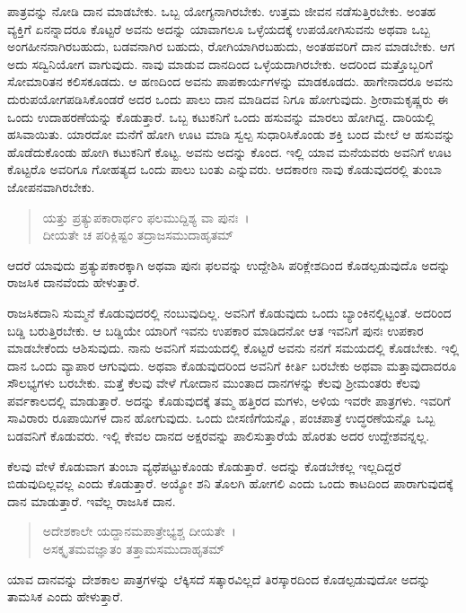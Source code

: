 ಪಾತ್ರವನ್ನು ನೋಡಿ ದಾನ ಮಾಡಬೇಕು. ಒಬ್ಬ ಯೋಗ್ಯನಾಗಿರಬೇಕು. ಉತ್ತಮ ಜೀವನ ನಡೆಸುತ್ತಿರಬೇಕು. ಅಂತಹ ವ್ಯಕ್ತಿಗೆ ಏನನ್ನಾದರೂ ಕೊಟ್ಟರೆ ಅವನು ಅದನ್ನು ಯಾವಾಗಲೂ ಒಳ್ಳೆಯದಕ್ಕೆ ಉಪಯೋಗಿಸುವನು ಅಥವಾ ಒಬ್ಬ ಅಂಗಹೀನನಾಗಿರಬಹುದು, ಬಡವನಾಗಿರ ಬಹುದು, ರೋಗಿಯಾಗಿರಬಹುದು, ಅಂತಹವರಿಗೆ ದಾನ ಮಾಡಬೇಕು. ಆಗ ಅದು ಸದ್ವಿನಿಯೋಗ ವಾಗುವುದು. ನಾವು ಮಾಡುವ ದಾನದಿಂದ ಒಳ್ಳೆಯದಾಗಿರಬೇಕು. ಅದರಿಂದ ಮತ್ತೊಬ್ಬರಿಗೆ ಸೋಮಾರಿತನ ಕಲಿಸಕೂಡದು. ಆ ಹಣದಿಂದ ಅವನು ಪಾಪಕಾರ್ಯಗಳನ್ನು ಮಾಡಕೂಡದು. ಹಾಗೇನಾದರೂ ಅವನು ದುರುಪಯೋಗಪಡಿಸಿಕೊಂಡರೆ ಅದರ ಒಂದು ಪಾಲು ದಾನ ಮಾಡಿದವ ನಿಗೂ ಹೋಗುವುದು. ಶ‍್ರೀರಾಮಕೃಷ್ಣರು ಈ ಒಂದು ಉದಾಹರಣೆಯನ್ನು ಕೊಡುತ್ತಾರೆ. ಒಬ್ಬ ಕಟುಕನಿಗೆ ಒಂದು ಹಸುವನ್ನು ಮಾರಲು ಹೋಗಿದ್ದ. ದಾರಿಯಲ್ಲಿ ಹಸಿವಾಯಿತು. ಯಾರದೋ ಮನೆಗೆ ಹೋಗಿ ಊಟ ಮಾಡಿ ಸ್ವಲ್ಪ ಸುಧಾರಿಸಿಕೊಂಡು ಶಕ್ತಿ ಬಂದ ಮೇಲೆ ಆ ಹಸುವನ್ನು ಹೊಡೆದುಕೊಂಡು ಹೋಗಿ ಕಟುಕನಿಗೆ ಕೊಟ್ಟ. ಅವನು ಅದನ್ನು ಕೊಂದ. ಇಲ್ಲಿ ಯಾವ ಮನೆಯವರು ಅವನಿಗೆ ಊಟ ಕೊಟ್ಟರೊ ಅವರಿಗೂ ಗೋಹತ್ಯದ ಒಂದು ಪಾಲು ಬಂತು ಎನ್ನುವರು. ಆದಕಾರಣ ನಾವು ಕೊಡುವುದರಲ್ಲಿ ತುಂಬಾ ಜೋಪನವಾಗಿರಬೇಕು.

\begin{verse}
ಯತ್ತು ಪ್ರತ್ಯುಪಕಾರಾರ್ಥಂ ಫಲಮುದ್ದಿಶ್ಯ ವಾ ಪುನಃ~।\\ದೀಯತೇ ಚ ಪರಿಕ್ಲಿಷ್ಟಂ ತದ್ರಾಜಸಮುದಾಹೃತಮ್ 
\end{verse}

{\small ಆದರೆ ಯಾವುದು ಪ್ರತ್ಯುಪಕಾರಕ್ಕಾಗಿ ಅಥವಾ ಪುನಃ ಫಲವನ್ನು ಉದ್ದೇಶಿಸಿ ಪರಿಕ್ಲೇಶದಿಂದ ಕೊಡಲ್ಪಡುವುದೊ ಅದನ್ನು ರಾಜಸಿಕ ದಾನವೆಂದು ಹೇಳುತ್ತಾರೆ.}

ರಾಜಸಿಕದಾನಿ ಸುಮ್ಮನೆ ಕೊಡುವುದರಲ್ಲಿ ನಂಬುವುದಿಲ್ಲ. ಅವನಿಗೆ ಕೊಡುವುದು ಒಂದು ಬ್ಯಾಂಕಿನಲ್ಲಿಟ್ಟಂತೆ. ಅದರಿಂದ ಬಡ್ಡಿ ಬರುತ್ತಿರಬೇಕು. ಆ ಬಡ್ಡಿಯೇ ಯಾರಿಗೆ ಇವನು ಉಪಕಾರ ಮಾಡಿದನೋ ಆತ ಇವನಿಗೆ ಪುನಃ ಉಪಕಾರ ಮಾಡಬೇಕೆಂದು ಆಶಿಸುವುದು. ನಾನು ಅವನಿಗೆ ಸಮಯದಲ್ಲಿ ಕೊಟ್ಟರೆ ಅವನು ನನಗೆ ಸಮಯದಲ್ಲಿ ಕೊಡಬೇಕು. ಇಲ್ಲಿ ದಾನ ಒಂದು ವ್ಯಾಪಾರ ಆಗುವುದು. ಅಥವಾ ಕೊಡುವುದರಿಂದ ಅವನಿಗೆ ಕೀರ್ತಿ ಬರಬೇಕು ಅಥವಾ ಮತ್ತಾವುದಾದರೂ ಸೌಲಭ್ಯಗಳು ಬರಬೇಕು. ಮತ್ತೆ ಕೆಲವು ವೇಳೆ ಗೋದಾನ ಮುಂತಾದ ದಾನಗಳನ್ನು ಕೆಲವು ಶ‍್ರೀಮಂತರು ಕೆಲವು ಪರ್ವಕಾಲದಲ್ಲಿ ಮಾಡುತ್ತಾರೆ. ಅದನ್ನು ಕೊಡುವುದಕ್ಕೆ ತಮ್ಮ ಹತ್ತಿರದ ಮಗಳು, ಅಳಿಯ ಇವರೇ ಪಾತ್ರಗಳು. ಇವರಿಗೆ ಸಾವಿರಾರು ರೂಪಾಯಿಗಳ ದಾನ ಹೋಗುವುದು. ಒಂದು ಬೀಸಣಿಗೆಯನ್ನೊ, ಪಂಚಪಾತ್ರೆ ಉದ್ಧರಣೆಯನ್ನೊ ಒಬ್ಬ ಬಡವನಿಗೆ ಕೊಡುವರು. ಇಲ್ಲಿ ಕೇವಲ ದಾನದ ಅಕ್ಷರವನ್ನು ಪಾಲಿಸುತ್ತಾರೆಯೆ ಹೊರತು ಅದರ ಉದ್ದೇಶವನ್ನಲ್ಲ.

ಕೆಲವು ವೇಳೆ ಕೊಡುವಾಗ ತುಂಬಾ ವ್ಯಥೆಪಟ್ಟುಕೊಂಡು ಕೊಡುತ್ತಾರೆ. ಅದನ್ನು ಕೊಡಬೇಕಲ್ಲ ಇಲ್ಲದಿದ್ದರೆ ಬಿಡುವುದಿಲ್ಲವಲ್ಲ ಎಂದು ಕೊಡುತ್ತಾರೆ. ಅಯ್ಯೋ ಶನಿ ತೊಲಗಿ ಹೋಗಲಿ ಎಂದು ಒಂದು ಕಾಟದಿಂದ ಪಾರಾಗುವುದಕ್ಕೆ ದಾನ ಮಾಡುತ್ತಾರೆ. ಇವೆಲ್ಲ ರಾಜಸಿಕ ದಾನ.

\begin{verse}
ಅದೇಶಕಾಲೇ ಯದ್ದಾನಮಪಾತ್ರೇಭ್ಯಶ್ಚ ದೀಯತೇ~।\\ಅಸಕ್ಕೃತಮವಜ್ಞಾತಂ ತತ್ತಾಮಸಮುದಾಹೃತಮ್ 
\end{verse}

{\small ಯಾವ ದಾನವನ್ನು ದೇಶಕಾಲ ಪಾತ್ರಗಳನ್ನು ಲೆಕ್ಕಿಸದೆ ಸತ್ಕಾರವಿಲ್ಲದೆ ತಿರಸ್ಕಾರದಿಂದ ಕೊಡಲ್ಪಡುವುದೋ ಅದನ್ನು ತಾಮಸಿಕ ಎಂದು ಹೇಳುತ್ತಾರೆ.}

